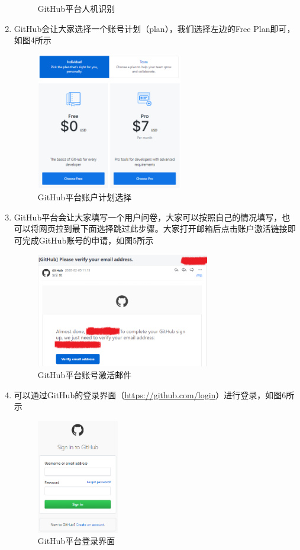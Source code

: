 \documentclass[a4paper,14pt]{article}
\begin{document}
\begin{enumerate}[1. ]
\begin{figure}[h]
\caption{GitHub平台人机识别}
\end{figure}
\newpage
\item GitHub会让大家选择一个账号计划（plan），我们选择左边的Free Plan即可，如图4所示
\begin{figure}[h]
\centering
\includegraphics[height=6cm]{figure/Plan_Select}
\caption{GitHub平台账户计划选择}
\end{figure}
\item GitHub平台会让大家填写一个用户问卷，大家可以按照自己的情况填写，也可以将网页拉到最下面选择跳过此步骤。大家打开邮箱后点击账户激活链接即可完成GitHub账号的申请，如图5所示
\begin{figure}[h]
\centering
\includegraphics[height=5cm]{figure/Verify_mail}
\caption{GitHub平台账号激活邮件}
\end{figure}
\item 可以通过GitHub的登录界面（\url{https://github.com/login}）进行登录，如图6所示
\begin{figure}[h]
\centering
\includegraphics[height=5cm]{figure/GitHub_SignIn}
\caption{GitHub平台登录界面}
\end{figure}
\end{enumerate}
\newpage
\end{document}
